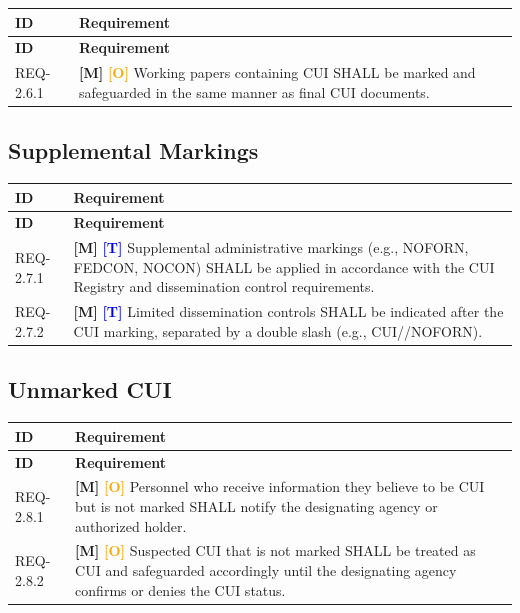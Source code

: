 \documentclass[11pt,letterpaper]{article}
\begin{document}
\begin{longtable}{@{}p{1.4cm}p{11.6cm}@{}}
\toprule
\textbf{ID} & \textbf{Requirement} \\
\midrule
\endfirsthead
\toprule
\textbf{ID} & \textbf{Requirement} \\
\midrule
\endhead

REQ-2.6.1 & \textcolor{mandatory}{\textbf{[M]}} \textcolor{orange}{\textbf{[O]}} Working papers containing CUI SHALL be marked and safeguarded in the same manner as final CUI documents. \\[6pt]

\bottomrule
\end{longtable}

\subsection{Supplemental Markings}

\begin{longtable}{@{}p{1.4cm}p{11.6cm}@{}}
\toprule
\textbf{ID} & \textbf{Requirement} \\
\midrule
\endfirsthead
\toprule
\textbf{ID} & \textbf{Requirement} \\
\midrule
\endhead

REQ-2.7.1 & \textcolor{mandatory}{\textbf{[M]}} \textcolor{blue}{\textbf{[T]}} Supplemental administrative markings (e.g., NOFORN, FEDCON, NOCON) SHALL be applied in accordance with the CUI Registry and dissemination control requirements. \\[6pt]

REQ-2.7.2 & \textcolor{mandatory}{\textbf{[M]}} \textcolor{blue}{\textbf{[T]}} Limited dissemination controls SHALL be indicated after the CUI marking, separated by a double slash (e.g., CUI//NOFORN). \\[6pt]

\bottomrule
\end{longtable}

\subsection{Unmarked CUI}

\begin{longtable}{@{}p{1.4cm}p{11.6cm}@{}}
\toprule
\textbf{ID} & \textbf{Requirement} \\
\midrule
\endfirsthead
\toprule
\textbf{ID} & \textbf{Requirement} \\
\midrule
\endhead

REQ-2.8.1 & \textcolor{mandatory}{\textbf{[M]}} \textcolor{orange}{\textbf{[O]}} Personnel who receive information they believe to be CUI but is not marked SHALL notify the designating agency or authorized holder. \\[6pt]

REQ-2.8.2 & \textcolor{mandatory}{\textbf{[M]}} \textcolor{orange}{\textbf{[O]}} Suspected CUI that is not marked SHALL be treated as CUI and safeguarded accordingly until the designating agency confirms or denies the CUI status. \\[6pt]

\bottomrule
\end{longtable}
\end{document}
